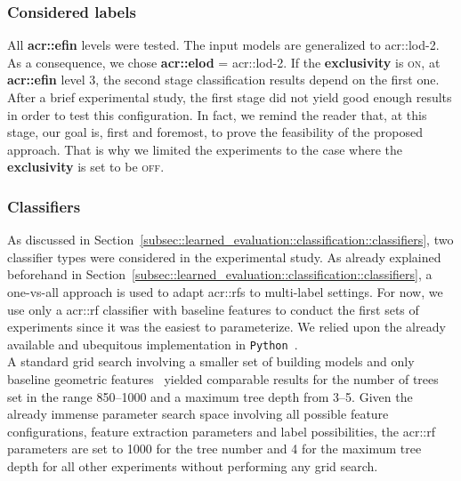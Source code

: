         \subsubsection{Considered labels}
            All \textbf{\gls{acr::efin}} levels were tested.
            The input models are generalized to \gls{acr::lod}-2.
            As a consequence, we chose \textbf{\gls{acr::elod}} = \gls{acr::lod}-2.
            If the \textbf{exclusivity} is \textsc{on}, at \textbf{\gls{acr::efin}} level 3, the second stage classification results depend on the first one.
            After a brief experimental study, the first stage did not yield good enough results in order to test this configuration.
            In fact, we remind the reader that, at this stage, our goal is, first and foremost, to prove the feasibility of the proposed approach.
            That is why we limited the experiments to the case where the \textbf{exclusivity} is set to be \textsc{off}.

        \subsubsection{Classifiers}
            As discussed in Section~\ref{subsec::learned_evaluation::classification::classifiers}, two classifier types were considered in the experimental study.
            As already explained beforehand in Section~\ref{subsec::learned_evaluation::classification::classifiers}, a one-vs-all approach is used to adapt \glspl{acr::rf} to multi-label settings.
            For now, we use only a \gls{acr::rf} classifier with baseline features to conduct the first sets of experiments since it was the easiest to parameterize.
            We relied upon the already available and ubequitous implementation in \verb!Python!~\parencite{scikit-learn}.\\
            
            A standard grid search involving a smaller set of building models and only baseline geometric features~\parencite{ennafii2018qualificationunannotated} yielded comparable results for the number of trees set in the range \numrange{850}{1000} and a maximum tree depth from \numrange{3}{5}.
            Given the already immense parameter search space involving all possible feature configurations, feature extraction parameters and label possibilities, the \gls{acr::rf} parameters are set to \num{1000} for the tree number and 4 for the maximum tree depth for all other experiments without performing any grid search.
    
